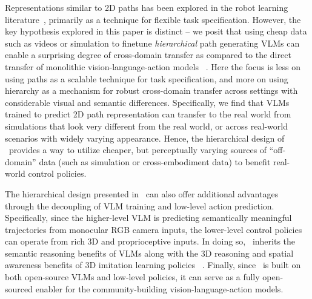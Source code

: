Representations similar to 2D paths has been explored in the robot learning literature~\citep{gu2023rttrajectory}, primarily as a technique for flexible task specification. However, the key hypothesis explored in this paper is distinct -- we posit that using cheap data such as videos or simulation to finetune \emph{hierarchical} path generating VLMs can enable a surprising degree of cross-domain transfer  as compared to the direct transfer of monolithic vision-language-action models ~\citep{brohan2022rt, kim2024openvla}. Here the focus is less on using paths as a scalable  technique for task specification, and more on using hierarchy as a mechanism for robust cross-domain transfer across settings with considerable visual and semantic differences. Specifically, we find that VLMs trained to predict 2D path representation can transfer to the real world from simulations that look very different from the real world, or across real-world scenarios with widely varying appearance. Hence, the hierarchical design of \method\ provides a way to utilize cheaper, but perceptually varying sources of ``off-domain'' data (such as simulation or cross-embodiment data) to benefit real-world control policies. 

The hierarchical design presented in \method\ can also offer additional advantages through the decoupling of VLM training and low-level action prediction. Specifically, since the higher-level VLM is predicting semantically meaningful trajectories from monocular RGB camera inputs, the lower-level control policies can operate from rich 3D and proprioceptive inputs. In doing so, \method\ inherits the semantic reasoning benefits of VLMs along with the 3D reasoning and spatial awareness benefits of 3D imitation learning policies ~\citep{goyal2024rvt, ke20243d}. Finally, since \method\ is built on both open-source VLMs and low-level policies, it can serve as a fully open-sourced enabler for the community-building vision-language-action models. 


